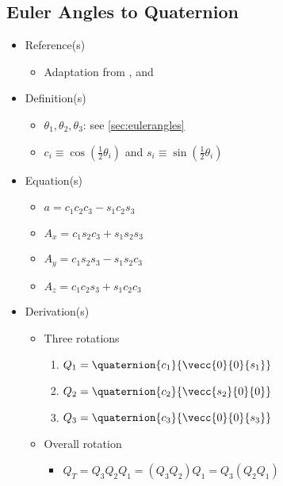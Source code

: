 \documentclass[letterpaper]{article}
\begin{document}
	\subsection{Euler Angles to Quaternion}
	\label{sec:eulerquaternion}
	\begin{itemize}
		\item Reference(s)
			\begin{itemize}
				\item Adaptation from \cite{Baker2008}, \cite{Rollett2008} and \cite{Wikipedia2008e}
			\end{itemize}
		\item Definition(s)
			\begin{itemize}
				\item $\theta_1, \theta_2, \theta_3$: see \ref{sec:eulerangles}
				\item $c_i \equiv \cos{\left(\frac{1}{2}\theta_i\right)}$ and $s_i \equiv \sin{\left(\frac{1}{2}\theta_i\right)}$
			\end{itemize}
		\item Equation(s)
			\begin{itemize}
				\item $a = c_1c_2c_3 - s_1c_2s_3$
				\item $A_x = c_1s_2c_3 + s_1s_2s_3$
				\item $A_y = c_1s_2s_3 - s_1s_2c_3$
				\item $A_z = c_1c_2s_3 + s_1c_2c_3$
			\end{itemize}
		\item Derivation(s)
			\begin{itemize}
				\item Three rotations
					\begin{enumerate}
						\item $Q_1 = \quaternion{c_1}{\vecc{0}{0}{s_1}}$
						\item $Q_2 = \quaternion{c_2}{\vecc{s_2}{0}{0}}$
						\item $Q_3 = \quaternion{c_3}{\vecc{0}{0}{s_3}}$
					\end{enumerate}
				\item Overall rotation
					\begin{itemize}
						\item $Q_T = Q_3 Q_2 Q_1 = \left(Q_3 Q_2\right) Q_1 = Q_3 \left(Q_2 Q_1\right)$
					\end{itemize}
			\end{itemize}
	\end{itemize}
	
\end{document}
